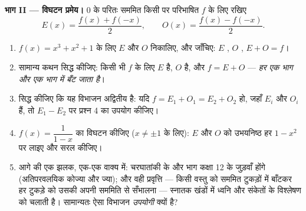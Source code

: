 \begin{problem}
\medskip
\noindent\textbf{भाग II --- विघटन प्रमेय।}
$0$ के परितः सममित किसी  पर परिभाषित  $f$ के लिए रखिए
\[
E(x) = \frac{f(x) + f(-x)}{2},
\qquad
O(x) = \frac{f(x) - f(-x)}{2} .
\]
\begin{enumerate}[resume]
  \item $f(x) = x^3 + x^2 + 1$ के लिए $E$ और $O$ निकालिए, और जाँचिए: $E$ , $O$
        , $E + O = f$।
  \item सामान्य कथन सिद्ध कीजिए: किसी भी $f$ के लिए  $E$  है,
        $O$  है, और $f = E + O$ --- \emph{हर  एक  भाग और एक  भाग
        में बँट जाता है}।
  \item सिद्ध कीजिए कि यह विभाजन अद्वितीय है: यदि $f = E_1 + O_1 = E_2 + O_2$ हो, जहाँ $E_i$ 
        और $O_i$  हैं, तो $E_1 - E_2$ पर प्रश्न 4 का उपयोग कीजिए।
  \item $f(x) = \dfrac{1}{1 - x}$ का विघटन कीजिए ($x \neq \pm 1$ के लिए): $E$ और $O$ को उभयनिष्ठ हर
        $1 - x^2$ पर लाइए और सरल कीजिए।
  \item आगे की एक झलक, एक-एक वाक्य में: चरघातांकी  के  और  भाग
        कक्षा 12 के जुड़वाँ  होंगे (अतिपरवलयिक कोज्या और ज्या); और वही
        प्रवृत्ति --- किसी वस्तु को सममित टुकड़ों में बाँटकर हर टुकड़े को
        उसकी अपनी सममिति से सँभालना --- स्नातक खंडों में ध्वनि और संकेतों
        के विश्लेषण को चलाती है। सामान्यतः ऐसा विभाजन \emph{उपयोगी} क्यों
        है?
\end{enumerate}


\end{problem}
